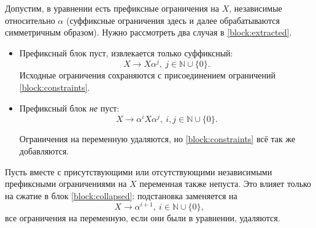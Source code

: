 \documentclass[12pt]{article}
\begin{document}
Допустим, в уравнении есть префиксные ограничения на $X$, независимые
относительно $\alpha$ (суффиксные ограничения здесь и далее обрабатываются
симметричным образом). Нужно рассмотреть два случая в \eqref{block:extracted}.
\begin{itemize}
  \item Префиксный блок пуст, извлекается только суффиксный:
  \begin{displaymath}
    X \to X \alpha^j, \ j \in \mathbb{N} \cup \{ 0 \}.
  \end{displaymath}
  Исходные ограничения сохраняются с присоединением ограничений
  \eqref{block:constraints}.
  
  \item Префиксный блок \textit{не} пуст:
  \begin{displaymath}
    X \to \alpha^i X \alpha^j, \ i, j \in \mathbb{N} \cup \{ 0 \}.
  \end{displaymath}

  Ограничения на переменную удаляются, но \eqref{block:constraints} всё так же
  добавляются.
\end{itemize}

Пусть вместе с присутствующими или отсутствующими независимыми префиксными
ограничениями на $X$ переменная также непуста. Это влияет только на сжатие
в блок \eqref{block:collapsed}: подстановка заменяется на
\begin{equation} \label{block:non-empty-collapsed}
  X \to \alpha^{i + 1}, \ i \in \mathbb{N} \cup \{ 0 \},
\end{equation}
все ограничения на переменную, если они были в уравнении, удаляются.
\end{document}
